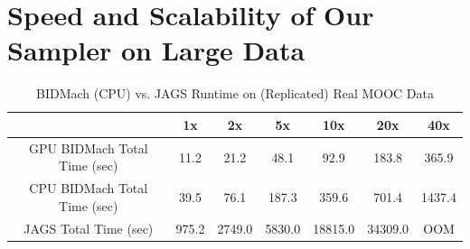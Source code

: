 \documentclass{article} %
\begin{document}
\section{Speed and Scalability of Our Sampler on Large Data}\label{sec:scaling_large_data}

%
%
% 
%
%
%
%
%
\begin{table}[t]
\small
\caption{BIDMach (CPU) vs. JAGS Runtime on (Replicated) Real MOOC Data}
\label{tab:bidmach_jags_realmooc}
\begin{center}
\begin{tabular}{ |c|c|c|c|c|c|c| } 
\hline
                             & 1x    & 2x     & 5x     & 10x     & 20x     & 40x    \\
\hline \hline
GPU BIDMach Total Time (sec) & 11.2  & 21.2   & 48.1   & 92.9    & 183.8   & 365.9  \\ 
CPU BIDMach Total Time (sec) & 39.5  & 76.1   & 187.3  & 359.6   & 701.4   & 1437.4 \\ 
JAGS Total Time (sec)        & 975.2 & 2749.0 & 5830.0 & 18815.0 & 34309.0 & OOM    \\
\hline
\end{tabular}
\end{center}
\end{table}
\end{document}
